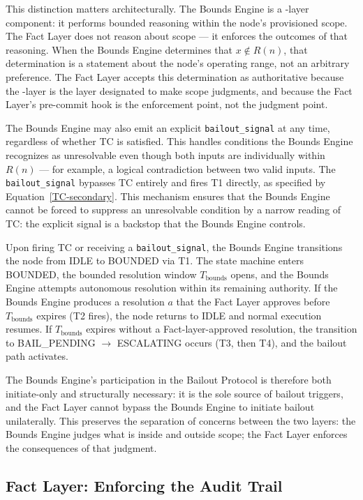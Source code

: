 This distinction matters architecturally. The Bounds Engine is a \bounds-layer{} component: it performs bounded reasoning within the node's provisioned scope. The Fact Layer does not reason about scope --- it enforces the outcomes of that reasoning. When the Bounds Engine determines that $x \notin R(n)$, that determination is a statement about the node's operating range, not an arbitrary preference. The Fact Layer accepts this determination as authoritative because the \bounds-layer{} is the layer designated to make scope judgments, and because the Fact Layer's pre-commit hook is the enforcement point, not the judgment point.

The Bounds Engine may also emit an explicit \texttt{bailout\_signal} at any time, regardless of whether TC is satisfied. This handles conditions the Bounds Engine recognizes as unresolvable even though both inputs are individually within $R(n)$ --- for example, a logical contradiction between two valid inputs. The \texttt{bailout\_signal} bypasses TC entirely and fires T1 directly, as specified by Equation~\ref{TC-secondary}. This mechanism ensures that the Bounds Engine cannot be forced to suppress an unresolvable condition by a narrow reading of TC: the explicit signal is a backstop that the Bounds Engine controls.

Upon firing TC or receiving a \texttt{bailout\_signal}, the Bounds Engine transitions the node from IDLE to BOUNDED via T1. The state machine enters BOUNDED, the bounded resolution window $T_{\text{bounds}}$ opens, and the Bounds Engine attempts autonomous resolution within its remaining authority. If the Bounds Engine produces a resolution $a$ that the Fact Layer approves before $T_{\text{bounds}}$ expires (T2 fires), the node returns to IDLE and normal execution resumes. If $T_{\text{bounds}}$ expires without a Fact-layer-approved resolution, the transition to BAIL\_PENDING $\rightarrow$ ESCALATING occurs (T3, then T4), and the bailout path activates.

The Bounds Engine's participation in the Bailout Protocol is therefore both initiate-only and structurally necessary: it is the sole source of bailout triggers, and the Fact Layer cannot bypass the Bounds Engine to initiate bailout unilaterally. This preserves the separation of concerns between the two layers: the Bounds Engine judges what is inside and outside scope; the Fact Layer enforces the consequences of that judgment.

\subsection{Fact Layer: Enforcing the Audit Trail}
\label{sec:fact-layer}

